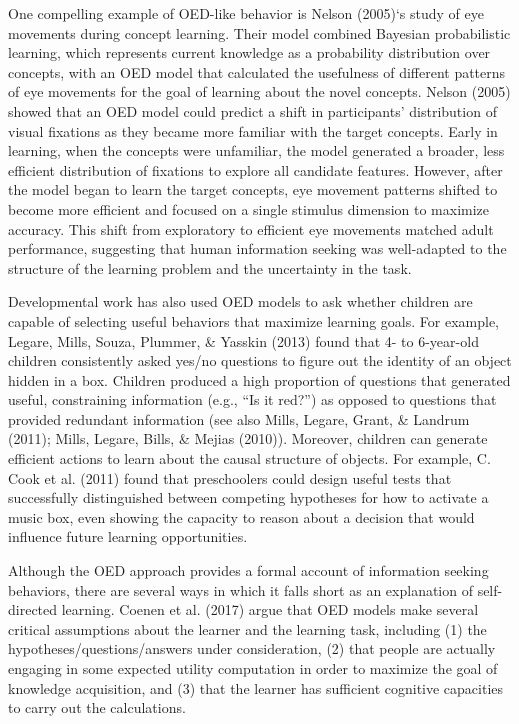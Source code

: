 \documentclass[oneside]{report}
\begin{document}
One compelling example of OED-like behavior is Nelson (2005)`s study of
eye movements during concept learning. Their model combined Bayesian
probabilistic learning, which represents current knowledge as a
probability distribution over concepts, with an OED model that
calculated the usefulness of different patterns of eye movements for the
goal of learning about the novel concepts. Nelson (2005) showed that an
OED model could predict a shift in participants' distribution of visual
fixations as they became more familiar with the target concepts. Early
in learning, when the concepts were unfamiliar, the model generated a
broader, less efficient distribution of fixations to explore all
candidate features. However, after the model began to learn the target
concepts, eye movement patterns shifted to become more efficient and
focused on a single stimulus dimension to maximize accuracy. This shift
from exploratory to efficient eye movements matched adult performance,
suggesting that human information seeking was well-adapted to the
structure of the learning problem and the uncertainty in the task.

Developmental work has also used OED models to ask whether children are
capable of selecting useful behaviors that maximize learning goals. For
example, Legare, Mills, Souza, Plummer, \& Yasskin (2013) found that 4-
to 6-year-old children consistently asked yes/no questions to figure out
the identity of an object hidden in a box. Children produced a high
proportion of questions that generated useful, constraining information
(e.g., ``Is it red?'') as opposed to questions that provided redundant
information (see also Mills, Legare, Grant, \& Landrum (2011); Mills,
Legare, Bills, \& Mejias (2010)). Moreover, children can generate
efficient actions to learn about the causal structure of objects. For
example, C. Cook et al. (2011) found that preschoolers could design
useful tests that successfully distinguished between competing
hypotheses for how to activate a music box, even showing the capacity to
reason about a decision that would influence future learning
opportunities.

Although the OED approach provides a formal account of information
seeking behaviors, there are several ways in which it falls short as an
explanation of self-directed learning. Coenen et al. (2017) argue that
OED models make several critical assumptions about the learner and the
learning task, including (1) the hypotheses/questions/answers under
consideration, (2) that people are actually engaging in some expected
utility computation in order to maximize the goal of knowledge
acquisition, and (3) that the learner has sufficient cognitive
capacities to carry out the calculations.
\end{document}

